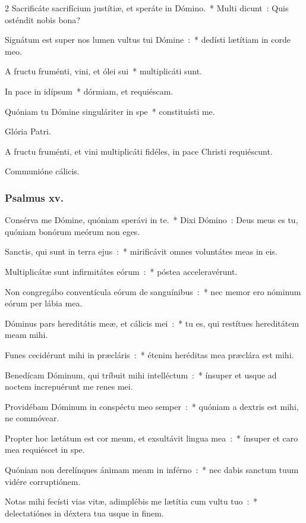 \documentclass[9pt,twoside]{extarticle}
\begin{document}
\begin{multicols}{2}
Sacrificáte sacrifícium justítiæ, et speráte in Dómino.~* Multi dicunt~: Quis osténdit nobis bona?

Signátum est super nos lumen vultus tui Dómine~:~* dedísti lætítiam in corde meo.

A fructu fruménti, vini, et ólei sui~* multiplicáti sunt.

In pace in idípsum~* dórmiam, et requiéscam.

Quóniam tu Dómine singuláriter in spe~* constituísti me.

Glória Patri.

\begin{tightlist}{}
\item {} A fructu fruménti, et vini multiplicáti fidéles, in pace Christi requiéscunt.
\item {} Communióne cálicis.
\end{tightlist}
\subsubsection*{\center Psalmus xv.}
\lettrine{C}onsérva me Dómine, quóniam sperávi in te.~* Dixi Dómino~: Deus meus es tu, quóniam bonórum meórum non eges.

Sanctis, qui sunt in terra ejus~:~* mirificávit omnes voluntátes meas in eis.

Multiplicátæ sunt infirmitátes eórum~:~* póstea acceleravérunt.

Non congregábo conventícula eórum de sanguínibus~:~* nec memor ero nóminum eórum per lábia mea.

Dóminus pars hereditátis meæ, et cálicis mei~:~* tu es, qui restítues hereditátem meam mihi.

Funes cecidérunt mihi in præcláris~:~* étenim heréditas mea præclára est mihi.

Benedícam Dóminum, qui tríbuit mihi intelléctum~:~* ínsuper et usque ad noctem increpuérunt me renes mei.

Providébam Dóminum in conspéctu meo semper~:~* quóniam a dextris est mihi, ne commóvear.

Propter hoc lætátum est cor meum, et exsultávit lingua mea~:~* ínsuper et caro mea requiéscet in spe.

Quóniam non derelínques ánimam meam in inférno~:~* nec dabis sanctum tuum vidére corruptiónem.

Notas mihi fecísti vias vitæ, adimplébis me lætítia cum vultu tuo~:~* delectatiónes in déxtera tua usque in finem.


\end{multicols}
\end{document}
